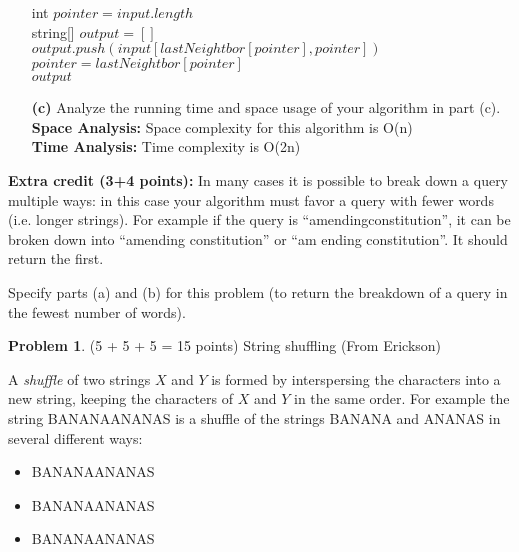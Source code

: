 \documentclass[11pt]{article}
\theoremstyle{definition}
\theoremstyle{theorem}
\newtheorem{prob}{Problem}
\begin{document}
\begin{itemize}
\begin{algorithm}[H]
{   {
    int $pointer = input.length$ \\
    string[] $output = []$ \\
     {
      $output.push(input[lastNeightbor[pointer], pointer])$ \\
      $pointer = lastNeightbor[pointer] $ \\
    }
    \Return $output$
  }
  \Return {[]}
}
\end{algorithm}

\item[{\bf (c)}]
  Analyze the running time and space usage of your algorithm in part (c).\\
\textbf{Space Analysis:} Space complexity for this algorithm is O(n) \\
\textbf{Time Analysis:} Time complexity is O(2n) \\

\end{itemize}

{\bf Extra credit (3+4 points):} In many cases it is possible to break down a query multiple ways: in this case your algorithm must favor a query with fewer words (i.e. longer strings). For example if the query is ``amendingconstitution'', it can be broken down into ``amending constitution'' or ``am ending constitution''. It should return the first.

Specify parts (a) and (b) for this problem (to return the breakdown of a query in the fewest number of words). 

\begin{prob}
(5 + 5 + 5 = 15 points) String shuffling (From Erickson)
\end{prob}

A {\em shuffle} of two strings $X$ and $Y$ is formed by interspersing the characters into a new string, keeping the characters of $X$ and $Y$ in the same order. For example the string {\color{red} BANANAANANAS} is a shuffle of the strings {\color{blue}BANANA} and {\color{red}ANANAS} in several different ways: 
\begin{itemize}
    \item{{\color{blue}BANANA}{\color{red}ANANAS}}
    \item{{\color{blue}BAN}{\color{red}ANA}{\color{blue}ANA}{\color{red}NAS}}
    \item{{\color{blue}B}{\color{red}AN}{\color{blue}AN}{\color{red}A}{\color{blue}A}{\color{red}NA}{\color{blue}NA}{\color{red}S}}
\end{itemize}
\end{document}
